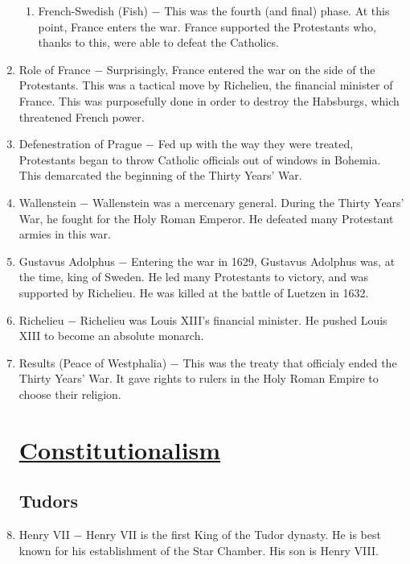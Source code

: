 \documentclass[12pt]{article}
\begin{document}
\begin{enumerate}
\begin{enumerate}[label=\arabic{*}.]
\item French-Swedish (Fish) $-$ This was the fourth (and final) phase. At this point, France enters the war. France supported the Protestants who, thanks to this, were able to defeat the Catholics.

\end{enumerate}
\setcounter{enumi}{145}
\item Role of France $-$ Surprisingly, France entered the war on the side of the Protestants. This was a tactical move by Richelieu, the financial minister of France. This was purposefully done in order to destroy the Habsburgs, which threatened French power.

\item Defenestration of Prague $-$ Fed up with the way they were treated, Protestants began to throw Catholic officials out of windows in Bohemia. This demarcated the beginning of the Thirty Years' War.

\item Wallenstein $-$ Wallenstein was a mercenary general. During the Thirty Years' War, he fought for the Holy Roman Emperor. He defeated many Protestant armies in this war.

\item Gustavus Adolphus $-$ Entering the war in 1629, Gustavus Adolphus was, at the time, king of Sweden. He led many Protestants to victory, and was supported by Richelieu. He was killed at the battle of Luetzen in 1632.

\item Richelieu $-$ Richelieu was Louis XIII's financial minister. He pushed Louis XIII to become an absolute monarch.

\item Results (Peace of Westphalia) $-$  This was the treaty that officialy ended the Thirty Years' War. It gave rights to rulers in the Holy Roman Empire to choose their religion.

\section{\underline{Constitutionalism}}

\subsection{Tudors}

\item Henry VII $-$ Henry VII is the first King of the Tudor dynasty. He is best known for his establishment of the Star Chamber. His son is Henry VIII.


\end{enumerate}
\end{document}

